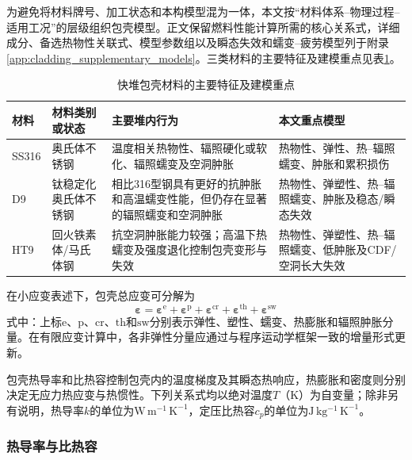 为避免将材料牌号、加工状态和本构模型混为一体，本文按“材料体系--物理过程--适用工况”的层级组织包壳模型。正文保留燃料性能计算所需的核心关系式，详细成分、备选热物性关联式、模型参数组以及瞬态失效和蠕变--疲劳模型列于附录\ref{app:cladding_supplementary_models}。三类材料的主要特征及建模重点见表\ref{tab:cladding_material_overview}。

\begin{table}[htbp]
	\centering
	\small
	\renewcommand{\arraystretch}{1.18}
	\caption{快堆包壳材料的主要特征及建模重点}
	\label{tab:cladding_material_overview}
	\begin{tabularx}{\textwidth}{p{2.1cm}p{3.0cm}X X}
		\toprule
		材料 & 材料类别或状态 & 主要堆内行为 & 本文重点模型 \\
		\midrule
		SS316 & 奥氏体不锈钢 & 温度相关热物性、辐照硬化或软化、辐照蠕变及空洞肿胀 & 热物性、弹性、热--辐照蠕变、肿胀和累积损伤 \\
		D9 & 钛稳定化奥氏体不锈钢 & 相比316型钢具有更好的抗肿胀和高温蠕变性能，但仍存在显著的辐照蠕变和空洞肿胀 & 热物性、弹塑性、热--辐照蠕变、肿胀及稳态/瞬态失效 \\
		HT9 & 回火铁素体/马氏体钢 & 抗空洞肿胀能力较强；高温下热蠕变及强度退化控制包壳变形与失效 & 热物性、弹塑性、热--辐照蠕变、低肿胀及CDF/空洞长大失效 \\
		\bottomrule
	\end{tabularx}
\end{table}

在小应变表述下，包壳总应变可分解为
\begin{equation}
	\boldsymbol{\varepsilon}
	=\boldsymbol{\varepsilon}^{\mathrm e}
	+\boldsymbol{\varepsilon}^{\mathrm p}
	+\boldsymbol{\varepsilon}^{\mathrm{cr}}
	+\boldsymbol{\varepsilon}^{\mathrm{th}}
	+\boldsymbol{\varepsilon}^{\mathrm{sw}}
	\label{eq:clad_total_strain_decomposition}
\end{equation}
式中：上标$\mathrm e$、$\mathrm p$、$\mathrm{cr}$、$\mathrm{th}$和$\mathrm{sw}$分别表示弹性、塑性、蠕变、热膨胀和辐照肿胀分量。在有限应变计算中，各非弹性分量应通过与程序运动学框架一致的增量形式更新。

\label{sec:cladding_thermophysical_properties}

包壳热导率和比热容控制包壳内的温度梯度及其瞬态热响应，热膨胀和密度则分别决定无应力热应变与热惯性。下列关系式均以绝对温度$T$（K）为自变量；除非另有说明，热导率$k$的单位为$\mathrm{W\,m^{-1}\,K^{-1}}$，定压比热容$c_p$的单位为$\mathrm{J\,kg^{-1}\,K^{-1}}$。

\subsubsection{热导率与比热容}

